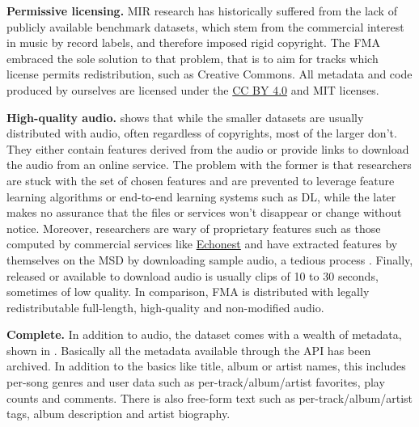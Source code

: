 \documentclass{article}
\newcommand{\todo}[1]{{\color{red} #1}}
\begin{document}
\textbf{Permissive licensing.} MIR research has historically suffered from the lack of publicly available benchmark datasets, which stem from the commercial interest in music by record labels, and therefore imposed rigid copyright.
The FMA embraced the sole solution to that problem, that is to aim for tracks which license permits redistribution, such as Creative Commons.
All metadata and code produced by ourselves are licensed under the \href{https://creativecommons.org/licenses/by/4.0)}{
CC BY 4.0} and MIT licenses.

\textbf{High-quality audio.}
 shows that while the smaller datasets are usually distributed with audio, often regardless of copyrights, most of the larger don't.
They either contain features derived from the audio or provide links to download the audio from an online service. The problem with the former is that researchers are stuck with the set of chosen features and are prevented to leverage feature learning algorithms or end-to-end learning systems such as DL, while the later  makes no assurance that the files or services won't disappear or change without notice.
Moreover, researchers are wary of proprietary features such as those computed by commercial services like \href{http://the.echonest.com/}{Echonest} and have extracted features by themselves on the MSD by downloading sample audio, a tedious process \cite{msd_features}.
Finally, released or available to download audio is usually clips of 10 to 30 seconds, sometimes of low quality.
In comparison, FMA is distributed with legally redistributable full-length, high-quality and non-modified audio.

\textbf{Complete.} In addition to audio, the dataset comes with a wealth of metadata, shown in . Basically all the metadata available through the API has been archived. In addition to the basics like title, album or artist names, this includes per-song genres and user data such as per-track/album/artist favorites, play counts and comments.
There is also free-form text such as per-track/album/artist tags, album description and artist biography.
\end{document}
